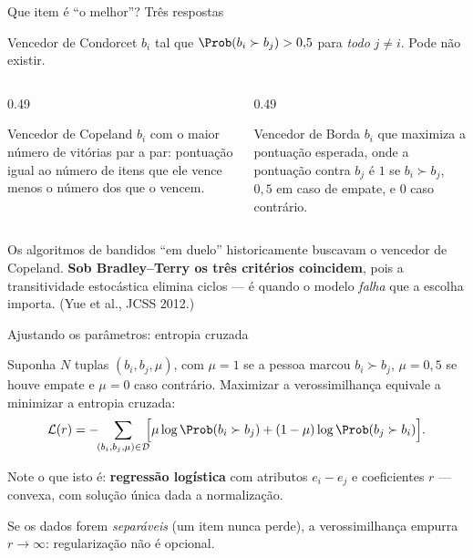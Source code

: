 \documentclass[aspectratio=169, 11pt]{beamer}
\newcommand{\Dset}{\mathcal{D}}
\begin{document}
\begin{frame}{Que item é ``o melhor''? Três respostas}

  \begin{defbox}{Vencedor de Condorcet}
    $b_i$ tal que $\Prob(b_i \succ b_j) > 0{,}5$ para \emph{todo} $j \ne i$.
    Pode não existir.
  \end{defbox}

  \begin{columns}[T]
  \begin{column}{0.49\textwidth}
    \begin{defbox}{Vencedor de Copeland}
      $b_i$ com o maior número de vitórias par a par: pontuação igual ao número
      de itens que ele vence menos o número dos que o vencem.
    \end{defbox}
  \end{column}
  \begin{column}{0.49\textwidth}
    \begin{defbox}{Vencedor de Borda}
      $b_i$ que maximiza a pontuação esperada, onde a pontuação contra $b_j$ é
      $1$ se $b_i \succ b_j$, $0{,}5$ em caso de empate, e $0$ caso contrário.
    \end{defbox}
  \end{column}
  \end{columns}

  \begin{ideiabox}
    Os algoritmos de bandidos ``em duelo'' historicamente buscavam o vencedor de
    Copeland. \textbf{Sob Bradley--Terry os três critérios coincidem}, pois a
    transitividade estocástica elimina ciclos --- é quando o modelo \emph{falha}
    que a escolha importa. {\scriptsize\color{rlCinza}(Yue et al., JCSS 2012.)}
  \end{ideiabox}
\end{frame}

\begin{frame}{Ajustando os parâmetros: entropia cruzada}

  Suponha $N$ tuplas $(b_i, b_j, \mu)$, com $\mu = 1$ se a pessoa marcou
  $b_i \succ b_j$, $\mu = 0{,}5$ se houve empate e $\mu = 0$ caso contrário.
  Maximizar a verossimilhança equivale a minimizar a entropia cruzada:
  \[
    \mathcal{L}(r) = -\!\!\sum_{(b_i,b_j,\mu)\in\Dset}\!\!
      \Bigl[\mu \log \Prob(b_i \succ b_j) + (1-\mu)\log \Prob(b_j \succ b_i)\Bigr].
  \]

  \begin{ideiabox}
    Note o que isto é: \textbf{regressão logística} com atributos $e_i - e_j$ e
    coeficientes $r$ --- convexa, com solução única dada a normalização.
  \end{ideiabox}

  \begin{alertabox}
    Se os dados forem \emph{separáveis} (um item nunca perde), a verossimilhança
    empurra $r \to \infty$: regularização não é opcional.
  \end{alertabox}
\end{frame}
\end{document}
